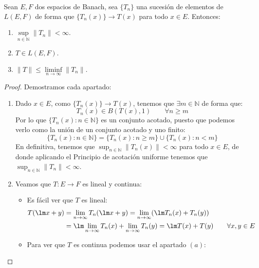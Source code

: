 \begin{coro}
    Sean $E,F$ dos espacios de Banach, sea $\{T_n\}$ una sucesión de elementos de $L(E,F)$ de forma que $\{T_n(x)\} \to T(x)$ para todo $x\in E$. Entonces:
    \begin{enumerate}[label=(\alph*)]
        \item $\sup\limits_{n\in \mathbb{N}}\|T_n\| < \infty$.
        \item $T\in L(E,F)$.
        \item $\|T\| \leq \liminf\limits_{n\to\infty}\|T_n\|$.
    \end{enumerate}
    \begin{proof}
        Demostramos cada apartado:
        \begin{enumerate}[label=(\alph*)]
            \item Dado $x\in E$, como $\{T_n(x)\}\to T(x)$, tenemos que $\exists m\in \mathbb{N}$ de forma que:
                \begin{equation*}
                    T_n(x) \in B(T(x), 1) \qquad \forall n\geq m
                \end{equation*}
                Por lo que $\{T_n(x) : n\in \mathbb{N}\}$ es un conjunto acotado, puesto que podemos verlo como la unión de un conjunto acotado y uno finito:
                \begin{equation*}
                    \{T_n(x) : n\in \mathbb{N}\} = \{T_n(x) : n\geq m\} \cup \{T_n(x) : n < m\} 
                \end{equation*}
                En definitiva, tenemos que $\sup_{n\in \mathbb{N}}\|T_n(x)\| < \infty$ para todo $x\in E$, de donde aplicando el Principio de acotación uniforme tenemos que $\sup_{n\in \mathbb{N}}\|T_n\| < \infty$.
            \item Veamos que $T:E\to F$ es lineal y continua:
                \begin{itemize}
                    \item Es fácil ver que $T$ es lineal:
                        \begin{align*}
                            T(\lm x + y) &= \lim_{n\to\infty}T_n(\lm x + y) = \lim_{n\to\infty}(\lm T_n(x) + T_n(y)) \\ 
                                         &= \lm \lim_{n\to\infty}T_n(x) + \lim_{n\to\infty}T_n(y) = \lm T(x) + T(y) \qquad \forall x,y\in E
                        \end{align*}
                    \item Para ver que $T$ es continua podemos usar el apartado $(a)$:

\end{itemize}
\end{enumerate}
\end{proof}
\end{coro}
